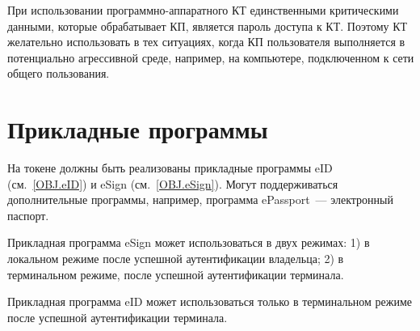 При использовании программно-аппаратного КТ единственными критическими данными, 
которые обрабатывает КП, является пароль доступа к КТ. Поэтому КТ 
желательно использовать в тех ситуациях, когда КП пользователя 
выполняется в потенциально агрессивной среде, например, 
на компьютере, подключенном к сети общего пользования.

\section{Прикладные программы} 

На токене должны быть реализованы прикладные программы eID (см.~\ref{OBJ.eID}) 
и eSign (см.~\ref{OBJ.eSign}). Могут поддерживаться дополнительные программы, 
например, программа ePassport~--- электронный паспорт. 

Прикладная программа eSign может использоваться в двух режимах:
1) в локальном режиме после успешной аутентификации владельца;
2) в терминальном режиме, после успешной аутентификации терминала.

Прикладная программа eID может использоваться только
в терминальном режиме после успешной аутентификации терминала.

